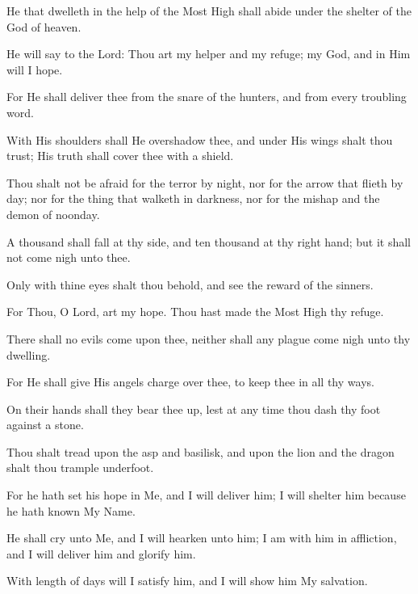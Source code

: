 He that dwelleth in the help of the Most High shall abide under the shelter of the God of heaven.

He will say to the Lord: Thou art my helper and my refuge; my God, and in Him will I hope.

For He shall deliver thee from the snare of the hunters, and from every troubling word.

With His shoulders shall He overshadow thee, and under His wings shalt thou trust; His truth shall cover thee with a shield.

Thou shalt not be afraid for the terror by night, nor for the arrow that flieth by day; nor for the thing that walketh in darkness, nor for the mishap and the demon of noonday.

A thousand shall fall at thy side, and ten thousand at thy right hand; but it shall not come nigh unto thee.

Only with thine eyes shalt thou behold, and see the reward of the sinners.

For Thou, O Lord, art my hope. Thou hast made the Most High thy refuge.

There shall no evils come upon thee, neither shall any plague come nigh unto thy dwelling.

For He shall give His angels charge over thee, to keep thee in all thy ways.

On their hands shall they bear thee up, lest at any time thou dash thy foot against a stone.

Thou shalt tread upon the asp and basilisk, and upon the lion and the dragon shalt thou trample underfoot.

For he hath set his hope in Me, and I will deliver him; I will shelter him because he hath known My Name.

He shall cry unto Me, and I will hearken unto him; I am with him in affliction, and I will deliver him and glorify him.

With length of days will I satisfy him, and I will show him My salvation.
